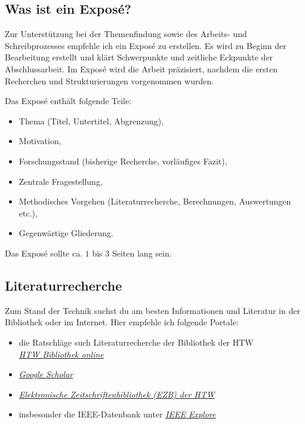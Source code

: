

\subsection{Was ist ein Exposé?}

Zur Unterstützung bei der Themenfindung sowie des Arbeits- und Schreibprozesses empfehle ich ein Exposé zu erstellen. Es wird  zu Beginn der Bearbeitung erstellt und klärt Schwerpunkte und zeitliche Eckpunkte der Abschlussarbeit. Im Exposé wird die Arbeit präzisiert, nachdem die ersten Recherchen und Strukturierungen vorgenommen wurden. 

Das Exposé enthält folgende Teile:
\begin{itemize}
\item Thema (Titel, Untertitel, Abgrenzung),
\item Motivation,
\item Forschungsstand (bisherige Recherche, vorläufiges Fazit),
\item Zentrale Fragestellung,
\item Methodisches Vorgehen (Literaturrecherche, Berechnungen, Auswertungen etc.),
\item Gegenwärtige Gliederung.
\end{itemize}
Das Exposé sollte ca. $1$ bis $3$ Seiten lang sein.

\subsection{Literaturrecherche}

Zum Stand der Technik suchst du am besten Informationen und Literatur in der Bibliothek oder im Internet. Hier empfehle ich folgende Portale:
\begin{itemize}
\item die Ratschläge such Literaturrecherche der Bibliothek der HTW\\ 
\hyperlink{https://bibliothek.htw-berlin.de/literatur-suchen/}{\emph{HTW Bibliothek online}}
    \item \hyperlink{scholar.google.com/}{\emph{Google Scholar}}
    \item  
    \hyperlink{http://ezb.uni-regensburg.de/fl.phtml?bibid=AAAAA&colors=7&lang=de&notation=ZN}{\emph{Elektronische Zeitschriftenbibliothek (EZB) der HTW}}
    \item     insbesonder die IEEE-Datenbank unter 
    \hyperlink{https://ieeexplore.ieee.org/xpl/RecentIssue.jsp?punumber=2}{\emph{IEEE Explore}}
\end{itemize}


